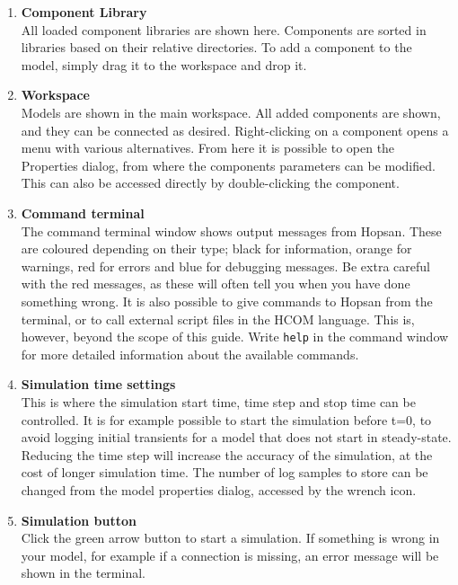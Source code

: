 \documentclass[a4paper,pdftex]{article}
\begin{document}
\begin{enumerate}
\item \textbf{Component Library}\\
All loaded component libraries are shown here.
Components are sorted in libraries based on their relative directories.
To add a component to the model, simply drag it to the workspace and drop it.

\item \textbf{Workspace}\\
Models are shown in the main workspace.
All added components are shown, and they can be connected as desired.
Right-clicking on a component opens a menu with various alternatives.
From here it is possible to open the Properties dialog, from where the components parameters can be modified.
This can also be accessed directly by double-clicking the component. 

\item \textbf{Command terminal} \\
The command terminal window shows output messages from Hopsan.
These are coloured depending on their type; black for information, orange for warnings, red for errors and blue for debugging messages.
Be extra careful with the red messages, as these will often tell you when you have done something wrong.
It is also possible to give commands to Hopsan from the terminal, or to call external script files in the HCOM language.
This is, however, beyond the scope of this guide.
Write \texttt{help} in the command window for more detailed information about the available commands. 

\item \textbf{Simulation time settings} \\
This is where the simulation start time, time step and stop time can be controlled.
It is for example possible to start the simulation before t=0, to avoid logging initial transients for a model that does not start in steady-state.
Reducing the time step will increase the accuracy of the simulation, at the cost of longer simulation time.
The number of log samples to store can be changed from the model properties dialog, accessed by the wrench icon.

\item \textbf{Simulation button} \\
Click the green arrow button to start a simulation.
If something is wrong in your model, for example if a connection is missing, an error message will be shown in the terminal.


\end{enumerate}
\end{document}
